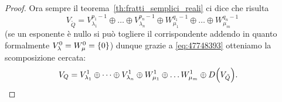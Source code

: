 \begin{proof}
Ora sempre il teorema~\ref{th:fratti_semplici_reali}
ci dice che risulta
\[
  V_{\tilde Q} = V_{\lambda_1}^{p_1-1} \oplus \dots \oplus V_{\lambda_n}^{p_n-1}
   \oplus W_{\mu_1}^{q_1-1} \oplus \dots \oplus W_{\mu_m}^{q_n-1}
\]
(se un esponente è nullo si può togliere il corrispondente
addendo in quanto formalmente $V_\lambda^0 = W_\mu^0 = {\left\{ 0 \right\}}$)
dunque grazie
a \eqref{eq:47748393} otteniamo la scomposizione cercata:
\begin{align*}
  V_Q &= V_{\lambda_1}^1 \oplus \dots \oplus V_{\lambda_n}^1
   \oplus W_{\mu_1}^1 \oplus \dots W_{\mu_m}^1
   \oplus D{\left( V_{\tilde Q} \right)}.
\end{align*}
\end{proof}


\begin{comment}
In base ai teoremi precedenti, se $P(x)/Q(x)$ è una qualunque funzione razionale reale,
possiamo innanzitutto
eseguire la divisione tra polinomi e trovare quindi un
quozionte $S(x)$ e un resto $R(x)$ con $\deg R < \deg Q$
cosicché
\[
  \frac{P(x)}{Q(x)} = S(x) + \frac{R(x)}{Q(x)}.
\]
Dopodiché possiamo decomporre $R(x)/Q(x)$
in fratti semplici. L'integrale di $P/Q$ si potrà quindi ricondurre (tramite combinazione lineare) agli integrali di $S$ e di ognuno dei fratti semplici. L'integrale di $S$ è banale, in quanto $S$ è un polinomio e quindi è combinazione lineare di potenze di $x$.

Non ci resta quindi che trovare l'integrale dei fratti semplici, cosa che faremo nel seguente teorema.

\begin{theorem}[integrale dei fratti semplici]
Se $\lambda\in \RR$, $p\in \NN$, $p>1$, $\alpha,\beta \in \RR$, $\alpha^2-4\beta < 0$, si ha:
\begin{align*}
  \int \frac{1}{x-\lambda}\, dx
  &= \ln \abs{x-\lambda} \\
  \int \frac{1}{(x-\lambda)^p}\, dx
  &=  -\frac{1}{(p-1)(x-\lambda)^{p-1}} \\
  \int \frac{1}{1+x^2}\, dx
  &= \arctg x \\
  \int \frac{1}{(1+x^2)^p}\, dx
   &= \frac{x}{2n(1+x^2)^{p-1}} + \frac{2p-3}{2p-2}\int \frac{1}{(1+x^2)^{p-1}}\, dx\\
  \int \frac{1}{x^2+\alpha x + \beta}\, dx
     &=
     \frac{2}{\sqrt{4\beta - \alpha^2}}
     \arctg \frac{2x+\alpha}{\sqrt{4\beta-\alpha^2}} \\
  \int \frac{1}{(x^2+\alpha x + \beta)^p}\, dx
    &=
    \enclose{\frac{4}{4\beta - \alpha^2}}^{p-\frac 1 2}
    \Enclose{\int \frac{1}{(1+y^2)^p}\, dy}_{y=\frac{2x+\alpha}{\sqrt{4\beta-\alpha^2}}}
 \\
  \int \frac{ax + b}{(x^2+\alpha x + \beta)^p}\, dx
   &= -\frac{a}{2(p-1)(x^2+\alpha x+ \beta)^{p-1}} \nonumber\\
   &\quad + \frac{2b-a\alpha}{2}\int \frac{1}{(x^2+\alpha x+\beta)^p}\, dx
\end{align*}


\end{comment}
